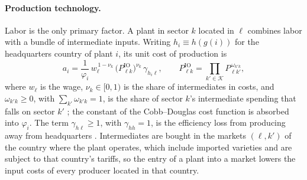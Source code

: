\documentclass[11pt]{article}
\theoremstyle{definition}
\theoremstyle{remark}
\newcommand{\cK}{\mathcal K}
\newcommand{\IO}{\mathrm{IO}}
\begin{document}
\paragraph{Production technology.} Labor is the only primary factor. A plant in sector
$k$ located in $\ell$ combines labor with a bundle of intermediate inputs. Writing
$h_i\equiv h(g(i))$ for the headquarters country of plant $i$, its unit cost of
production is
\begin{equation}
  a_i=\frac{1}{\varphi_i}\,w_\ell^{\,1-\nu_k}\,\bigl(P^{\IO}_{\ell k}\bigr)^{\nu_k}\,
  \gamma_{h_i\ell},
  \qquad
  P^{\IO}_{\ell k}=\prod_{k'\in\cK}P_{\ell k'}^{\,\omega_{k'k}},
  \label{eq:cost}
\end{equation}
where $w_\ell$ is the wage, $\nu_k\in[0,1)$ is the share of intermediates in costs,
and $\omega_{k'k}\ge0$, with $\sum_{k'}\omega_{k'k}=1$, is the share of sector $k$'s
intermediate spending that falls on sector $k'$ \citep{CaliendoParro2015}; the
constant of the Cobb--Douglas cost function is absorbed into $\varphi_i$. The term
$\gamma_{h\ell}\ge1$, with $\gamma_{hh}=1$, is the efficiency loss from producing away
from headquarters \citep{RamondoRodriguezClare2013,HeadMayer2019}. Intermediates are
bought in the markets $(\ell,k')$ of the country where the plant operates, which
include imported varieties and are subject to that country's tariffs, so the entry of
a plant into a market lowers the input costs of every producer located in that country.
\end{document}
